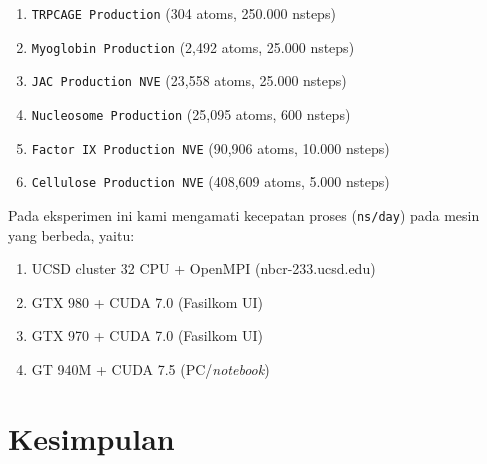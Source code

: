 \begin{enumerate}
	\item \verb|TRPCAGE Production| (304 atoms, 250.000 nsteps)
	\item \verb|Myoglobin Production| (2,492 atoms, 25.000 nsteps)
	\item \verb|JAC Production NVE| (23,558 atoms, 25.000 nsteps)
	\item \verb|Nucleosome Production| (25,095 atoms, 600 nsteps)
	\item \verb|Factor IX Production NVE| (90,906 atoms, 10.000 nsteps)
	\item \verb|Cellulose Production NVE| (408,609 atoms, 5.000 nsteps)	
\end{enumerate}

Pada eksperimen ini kami mengamati kecepatan proses (\verb|ns/day|) pada mesin yang berbeda, yaitu:

\begin{enumerate}
	\item UCSD cluster 32 CPU + OpenMPI (nbcr-233.ucsd.edu)
	\item GTX 980 + CUDA 7.0 (Fasilkom UI)
	\item GTX 970 + CUDA 7.0 (Fasilkom UI)
	\item GT 940M + CUDA 7.5 (PC/\textit{notebook})
\end{enumerate}


\todo{}

\section{Kesimpulan}

\todo{}